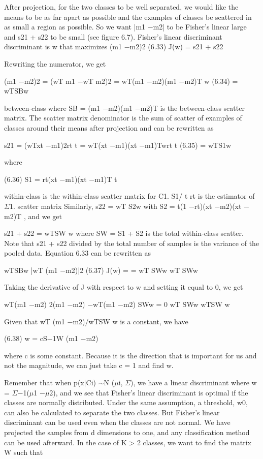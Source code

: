 After projection, for the two classes to be well separated, we would like the means to be as far apart as possible and the examples of classes be scattered in as small a region as possible. So we want |m1 $-$m2| to be Fisher’s linear large and s21 + s22 to be small (see figure 6.7). Fisher’s linear discriminant discriminant is w that maximizes (m1 $-$m2)2 (6.33) J(w) = s21 + s22

Rewriting the numerator, we get

(m1 $-$m2)2 = (wT m1 $-$wT m2)2 = wT(m1 $-$m2)(m1 $-$m2)T w (6.34) = wTSBw

between-class where SB = (m1 $-$m2)(m1 $-$m2)T is the between-class scatter matrix. The scatter matrix denominator is the sum of scatter of examples of classes around their means after projection and can be rewritten as

s21 = (wTxt $-$m1)2rt t = wT(xt $-$m1)(xt $-$m1)Twrt t (6.35) = wTS1w

where

(6.36) S1 = rt(xt $-$m1)(xt $-$m1)T t

within-class is the within-class scatter matrix for C1. S1/ t rt is the estimator of $\Sigma$1. scatter matrix Similarly, s22 = wT S2w with S2 = t(1 $-$rt)(xt $-$m2)(xt $-$m2)T , and we get

s21 + s22 = wTSW w where SW = S1 + S2 is the total within-class scatter. Note that s21 + s22 divided by the total number of samples is the variance of the pooled data. Equation 6.33 can be rewritten as

wTSBw |wT (m1 $-$m2)|2 (6.37) J(w) = = wT SWw wT SWw

Taking the derivative of J with respect to w and setting it equal to 0, we get

wT(m1 $-$m2) 2(m1 $-$m2) $-$wT(m1 $-$m2) SWw = 0 wT SWw wTSW w

Given that wT (m1 $-$m2)/wTSW w is a constant, we have

(6.38) w = cS$-$1W (m1 $-$m2)

where c is some constant. Because it is the direction that is important for us and not the magnitude, we can just take c = 1 and find w.

Remember that when p(x|Ci) $\sim$N ($\mu$i, $\Sigma$), we have a linear discriminant where w = $\Sigma$$-$1($\mu$1 $-$$\mu$2), and we see that Fisher’s linear discriminant is optimal if the classes are normally distributed. Under the same assumption, a threshold, w0, can also be calculated to separate the two classes. But Fisher’s linear discriminant can be used even when the classes are not normal. We have projected the samples from d dimensions to one, and any classification method can be used afterward. In the case of K > 2 classes, we want to find the matrix W such that

